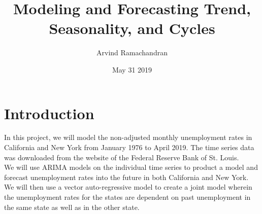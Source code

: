 \documentclass{article}
\author{Arvind Ramachandran}
\title{Modeling and Forecasting Trend, Seasonality, and Cycles}
\date{May 31 2019}
\begin{document}
\maketitle
\section{Introduction}

In this project, we will model the non-adjusted monthly unemployment rates in California and New York from January 1976 to April 2019. The time series data was downloaded from the website of the Federal Reserve Bank of St. Louis. \\

\noindent We will use ARIMA models on the individual time series to product a model and forecast unemployment rates into the future in both California and New York. We will then use a vector auto-regressive model to create a joint model wherein the unemployment rates for the states are dependent on past unemployment in the same state as well as in the other state.
\newpage
\end{document}
